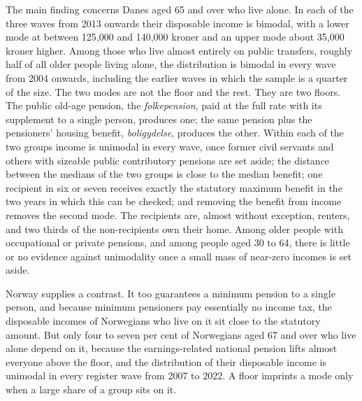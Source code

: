 The main finding concerns Danes aged 65 and over who live alone. In each of the three waves from 2013 onwards their disposable income is bimodal, with a lower mode at between 125{,}000 and 140{,}000 kroner and an upper mode about 35{,}000 kroner higher. Among those who live almost entirely on public transfers, roughly half of all older people living alone, the distribution is bimodal in every wave from 2004 onwards, including the earlier waves in which the sample is a quarter of the size. The two modes are not the floor and the rest. They are two floors. The public old-age pension, the \emph{folkepension}, paid at the full rate with its supplement to a single person, produces one; the same pension plus the pensioners' housing benefit, \emph{boligydelse}, produces the other. Within each of the two groups income is unimodal in every wave, once former civil servants and others with sizeable public contributory pensions are set aside; the distance between the medians of the two groups is close to the median benefit; one recipient in six or seven receives exactly the statutory maximum benefit in the two years in which this can be checked; and removing the benefit from income removes the second mode. The recipients are, almost without exception, renters, and two thirds of the non-recipients own their home. Among older people with occupational or private pensions, and among people aged 30 to 64, there is little or no evidence against unimodality once a small mass of near-zero incomes is set aside.

Norway supplies a contrast. It too guarantees a minimum pension to a single person, and because minimum pensioners pay essentially no income tax, the disposable incomes of Norwegians who live on it sit close to the statutory amount. But only four to seven per cent of Norwegians aged 67 and over who live alone depend on it, because the earnings-related national pension lifts almost everyone above the floor, and the distribution of their disposable income is unimodal in every register wave from 2007 to 2022. A floor imprints a mode only when a large share of a group sits on it.

